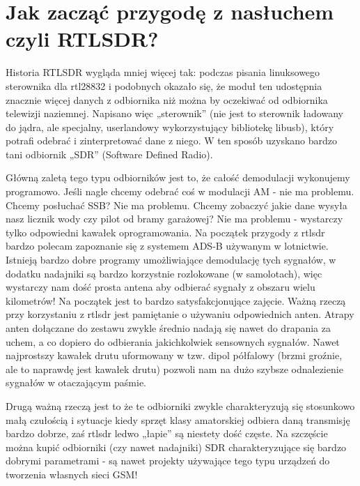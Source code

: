 \documentclass[a4paper,12pt]{article}
\begin{document}
\section{Jak zacząć przygodę z nasłuchem czyli RTLSDR?}
Historia RTLSDR wygląda mniej więcej tak: podczas pisania linuksowego sterownika dla rtl28832 i podobnych okazało się, że moduł ten udostępnia znacznie więcej danych z odbiornika niż można by oczekiwać od odbiornika telewizji naziemnej. Napisano więc „sterownik” (nie jest to sterownik ładowany do jądra, ale specjalny, userlandowy wykorzystujący bibliotekę libusb), który potrafi odebrać i zinterpretować dane z niego. W ten sposób uzyskano bardzo tani odbiornik „SDR” (Software Defined Radio).

Główną zaletą tego typu odbiorników jest to, że całość demodulacji wykonujemy programowo. Jeśli nagle chcemy odebrać coś w modulacji AM - nie ma problemu. Chcemy posłuchać SSB? Nie ma problemu. Chcemy zobaczyć jakie dane wysyła nasz licznik wody czy pilot od bramy garażowej? Nie ma problemu - wystarczy tylko odpowiedni kawałek oprogramowania.
Na początek przygody z rtlsdr bardzo polecam zapoznanie się z systemem ADS-B używanym w lotnictwie. Istnieją bardzo dobre programy umożliwiające demodulację tych sygnałów, w dodatku nadajniki są bardzo korzystnie rozlokowane (w samolotach), więc wystarczy nam dość prosta antena aby odbierać sygnały z obszaru wielu kilometrów! Na początek jest to bardzo satysfakcjonujące zajęcie.
Ważną rzeczą przy korzystaniu z rtlsdr jest pamiętanie o używaniu odpowiednich anten. Atrapy anten dołączane do zestawu zwykle średnio nadają się nawet do drapania za uchem, a co dopiero do odbierania jakichkolwiek sensownych sygnałów. Nawet najprostszy kawałek drutu uformowany w tzw. dipol półfalowy (brzmi groźnie, ale to naprawdę jest kawałek drutu) pozwoli nam na dużo szybsze odnalezienie sygnałów w otaczającym paśmie.

Drugą ważną rzeczą jest to że te odbiorniki zwykle charakteryzują się stosunkowo małą czułością i sytuacje kiedy sprzęt klasy amatorskiej odbiera daną transmisję bardzo dobrze, zaś rtlsdr ledwo „łapie” są niestety dość częste. Na szczęście można kupić odbiorniki (czy nawet nadajniki) SDR charakteryzujące się bardzo dobrymi parametrami - są nawet projekty używające tego typu urządzeń do tworzenia własnych sieci GSM!
\end{document}
